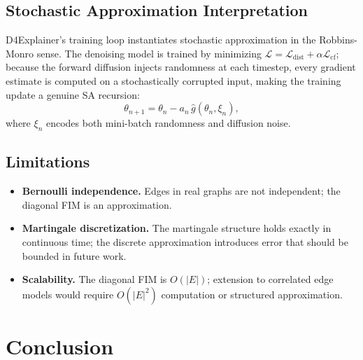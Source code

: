 \documentclass[11pt]{article}
\newcommand{\Lcf}{\mathcal{L}_{\text{cf}}}
\newcommand{\Ldist}{\mathcal{L}_{\text{dist}}}
\begin{document}
\subsection{Stochastic Approximation Interpretation}

D4Explainer's training loop instantiates stochastic approximation
in the Robbins-Monro sense. The denoising model is trained by
minimizing $\mathcal{L} = \Ldist + \alpha\Lcf$; because the forward
diffusion injects randomness at each timestep, every gradient
estimate is computed on a stochastically corrupted input, making the
training update a genuine SA recursion:
\begin{equation}
  \theta_{n+1} = \theta_n - a_n\,\hat{g}(\theta_n, \xi_n),
\end{equation}
where $\xi_n$ encodes both mini-batch randomness and diffusion noise.

\subsection{Limitations}

\begin{itemize}
  \item \textbf{Bernoulli independence.} Edges in real graphs are
    not independent; the diagonal FIM is an approximation.
  \item \textbf{Martingale discretization.} The martingale structure
    holds exactly in continuous time; the discrete approximation
    introduces error that should be bounded in future work.
  \item \textbf{Scalability.} The diagonal FIM is $O(|E|)$; extension
    to correlated edge models would require $O(|E|^2)$ computation
    or structured approximation.
\end{itemize}

\section{Conclusion}

\end{document}
